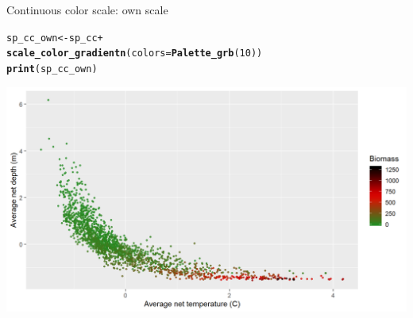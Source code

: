 \documentclass{beamer}\usepackage[]{graphicx}\usepackage[]{color}
\makeatletter
\newcommand{\hlnum}[1]{\textcolor[rgb]{0.686,0.059,0.569}{#1}}%
\newcommand{\hlopt}[1]{\textcolor[rgb]{0,0,0}{#1}}%
\newcommand{\hlstd}[1]{\textcolor[rgb]{0.345,0.345,0.345}{#1}}%
\newcommand{\hlkwb}[1]{\textcolor[rgb]{0.69,0.353,0.396}{#1}}%
\newcommand{\hlkwc}[1]{\textcolor[rgb]{0.333,0.667,0.333}{#1}}%
\newcommand{\hlkwd}[1]{\textcolor[rgb]{0.737,0.353,0.396}{\textbf{#1}}}%
\newenvironment{kframe}{%
 \def\at@end@of@kframe{}%
 \ifinner\ifhmode%
  \def\at@end@of@kframe{\end{minipage}}%
  \begin{minipage}{\columnwidth}%
 \fi\fi%
 \def\FrameCommand##1{\hskip\@totalleftmargin \hskip-\fboxsep
 \colorbox{shadecolor}{##1}\hskip-\fboxsep
     \hskip-\linewidth \hskip-\@totalleftmargin \hskip\columnwidth}%
 \MakeFramed {\advance\hsize-\width
   \@totalleftmargin\z@ \linewidth\hsize
   \@setminipage}}%
 {\par\unskip\endMakeFramed%
 \at@end@of@kframe}
\newenvironment{knitrout}{}{} %
\makeatother
\begin{document}
\begin{frame}[fragile]{Continuous color scale: own scale}
\begin{knitrout}\footnotesize
{}\color{fgcolor}\begin{kframe}
\begin{alltt}
\hlstd{sp_cc_own} \hlkwb{<-} \hlstd{sp_cc} \hlopt{+}
  \hlkwd{scale_color_gradientn}\hlstd{(}\hlkwc{colors} \hlstd{=} \hlkwd{Palette_grb}\hlstd{(}\hlnum{10}\hlstd{))}
\hlkwd{print}\hlstd{(sp_cc_own)}
\end{alltt}
\end{kframe}

{\centering \includegraphics[width=.9\linewidth]{figure/sp_continuous_color6-1} 

}



\end{knitrout}
\end{frame}
\end{document}
